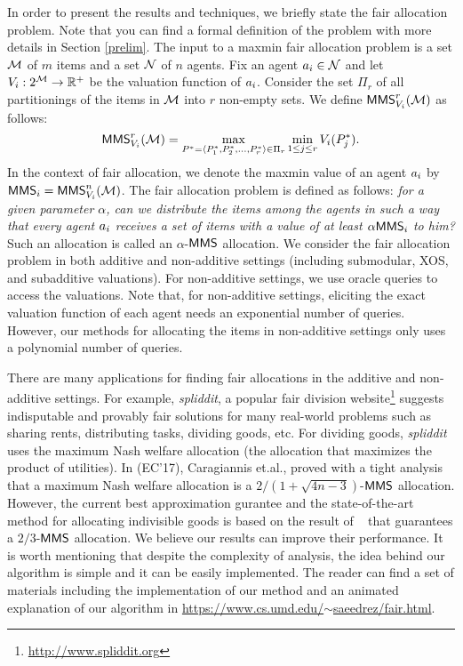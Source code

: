 {In order to present the results and techniques, we briefly state the fair allocation problem. Note that you can find a formal definition of the problem with more details in Section \ref{prelim}. The input to a maxmin fair allocation problem is a set $\mathcal{M}$ of $m$ items and a set $\mathcal{N}$ of $n$ agents. Fix an agent $a_i \in \mathcal{N}$ and let $V_i: 2^{\mathcal{M}} \rightarrow \mathbb{R}^+$ be the valuation function of $a_i$. Consider the set $\Pi_r$ of all partitionings of the items in $\mathcal{M}$ into $r$ non-empty sets. We define $\mathsf{MMS}_{V_i}^r(\mathcal{M})$ as follows:
 $$\mathsf{MMS}_{V_i}^r(\mathcal{M}) =  \max_{P^* = \langle P^*_1,P^*_2,\ldots,P^*_r\rangle \in \Pi_r} \min_{1 \leq j \leq r} V_i(P^*_j).$$
In the context of fair allocation, we denote the maxmin value of an agent $a_i$ by $\mathsf{MMS}_i = \mathsf{MMS}^n_{V_i}(\mathcal{M})$. The fair allocation problem is defined as follows: \textit{for a given parameter $\alpha$, can we distribute the items among the agents in such a way that every agent $a_i$ receives a set of items with a value of at least $\alpha \mathsf{MMS}_i$ to him?} Such an allocation is called an $\alpha$-$\mathsf{MMS}$ allocation. We consider the fair allocation problem in both additive and non-additive settings (including submodular, XOS, and subadditive valuations).  For non-additive settings, we use oracle queries to  access the valuations. Note that, for non-additive settings, eliciting the exact valuation function of each agent needs an exponential number of queries. However, our methods for allocating the items in non-additive settings only uses a polynomial number of queries.

There are many applications for finding fair allocations in the additive and non-additive settings. For example,  
\emph{spliddit}, a popular fair division website\footnote{
\url{http://www.spliddit.org}} suggests indisputable and provably fair solutions for many real-world problems such as sharing rents, distributing tasks, dividing goods, etc. For dividing goods, \emph{spliddit} uses the maximum Nash welfare allocation (the allocation that maximizes the product of utilities). In \cite{caragiannis2016unreasonable} (EC'17), Caragiannis et.al., proved with a tight analysis that a maximum Nash welfare allocation is a $2/(1+\sqrt{4n-3})$-$\mathsf{MMS}$ allocation. However, the current best approximation gurantee and the state-of-the-art method for allocating indivisible goods is based on the result of ~\cite{Procaccia:first} that guarantees a $2/3$-$\mathsf{MMS}$ allocation. We believe our results can improve their performance.  It is worth mentioning that despite the complexity of analysis, the idea behind our algorithm is simple and it can be easily implemented. The reader can find a set of materials including the implementation of our method and an animated explanation of our algorithm in \href{https://www.cs.umd.edu/\~saeedrez/fair.html}{https://www.cs.umd.edu/$\sim$saeedrez/fair.html}.


}
